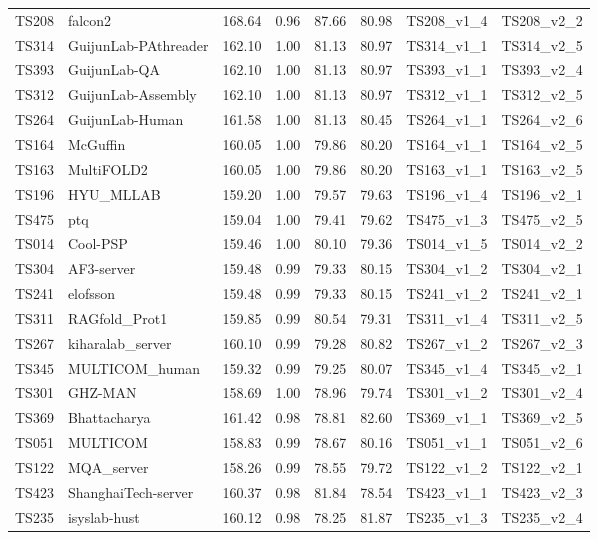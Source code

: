 \begin{longtable}{llllllll}
TS208 & falcon2 & 168.64 & 0.96 & 87.66 & 80.98 & TS208\_v1\_4 & TS208\_v2\_2 \\ 
TS314 & GuijunLab-PAthreader & 162.10 & 1.00 & 81.13 & 80.97 & TS314\_v1\_1 & TS314\_v2\_5 \\ 
TS393 & GuijunLab-QA & 162.10 & 1.00 & 81.13 & 80.97 & TS393\_v1\_1 & TS393\_v2\_4 \\ 
TS312 & GuijunLab-Assembly & 162.10 & 1.00 & 81.13 & 80.97 & TS312\_v1\_1 & TS312\_v2\_5 \\ 
TS264 & GuijunLab-Human & 161.58 & 1.00 & 81.13 & 80.45 & TS264\_v1\_1 & TS264\_v2\_6 \\ 
TS164 & McGuffin & 160.05 & 1.00 & 79.86 & 80.20 & TS164\_v1\_1 & TS164\_v2\_5 \\ 
TS163 & MultiFOLD2 & 160.05 & 1.00 & 79.86 & 80.20 & TS163\_v1\_1 & TS163\_v2\_5 \\ 
TS196 & HYU\_MLLAB & 159.20 & 1.00 & 79.57 & 79.63 & TS196\_v1\_4 & TS196\_v2\_1 \\ 
TS475 & ptq & 159.04 & 1.00 & 79.41 & 79.62 & TS475\_v1\_3 & TS475\_v2\_5 \\ 
TS014 & Cool-PSP & 159.46 & 1.00 & 80.10 & 79.36 & TS014\_v1\_5 & TS014\_v2\_2 \\ 
TS304 & AF3-server & 159.48 & 0.99 & 79.33 & 80.15 & TS304\_v1\_2 & TS304\_v2\_1 \\ 
TS241 & elofsson & 159.48 & 0.99 & 79.33 & 80.15 & TS241\_v1\_2 & TS241\_v2\_1 \\ 
TS311 & RAGfold\_Prot1 & 159.85 & 0.99 & 80.54 & 79.31 & TS311\_v1\_4 & TS311\_v2\_5 \\ 
TS267 & kiharalab\_server & 160.10 & 0.99 & 79.28 & 80.82 & TS267\_v1\_2 & TS267\_v2\_3 \\ 
TS345 & MULTICOM\_human & 159.32 & 0.99 & 79.25 & 80.07 & TS345\_v1\_4 & TS345\_v2\_1 \\ 
TS301 & GHZ-MAN & 158.69 & 1.00 & 78.96 & 79.74 & TS301\_v1\_2 & TS301\_v2\_4 \\ 
TS369 & Bhattacharya & 161.42 & 0.98 & 78.81 & 82.60 & TS369\_v1\_1 & TS369\_v2\_5 \\ 
TS051 & MULTICOM & 158.83 & 0.99 & 78.67 & 80.16 & TS051\_v1\_1 & TS051\_v2\_6 \\ 
TS122 & MQA\_server & 158.26 & 0.99 & 78.55 & 79.72 & TS122\_v1\_2 & TS122\_v2\_1 \\ 
TS423 & ShanghaiTech-server & 160.37 & 0.98 & 81.84 & 78.54 & TS423\_v1\_1 & TS423\_v2\_3 \\ 
TS235 & isyslab-hust & 160.12 & 0.98 & 78.25 & 81.87 & TS235\_v1\_3 & TS235\_v2\_4 \\ 

\end{longtable}
